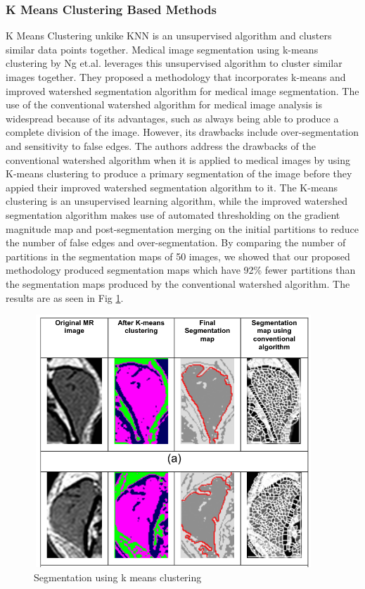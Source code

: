 \documentclass[19pt]{article}
\begin{document}
\subsubsection{K Means Clustering Based Methods}
K Means Clustering unkike KNN is an unsupervised algorithm and clusters similar data points together. Medical image segmentation using k-means clustering by Ng et.al. \cite{ng2006medical} leverages this unsupervised algorithm to cluster similar images together. They proposed a methodology that incorporates k-means and improved watershed segmentation algorithm for medical image segmentation. The use of the conventional watershed algorithm for medical image analysis is widespread because of its advantages, such as always being able to produce  a  complete    division    of    the    image.    However,    its    drawbacks  include  over-segmentation  and  sensitivity  to   false   edges.   The authors  address   the   drawbacks   of   the   conventional watershed algorithm when it is applied to medical   images   by   using   K-means   clustering   to   produce  a  primary  segmentation  of  the  image  before  they   appied their   improved   watershed   segmentation   algorithm   to   it.   The   K-means   clustering   is   an   unsupervised  learning  algorithm,  while  the  improved  watershed   segmentation   algorithm   makes   use   of automated  thresholding  on  the  gradient  magnitude  map  and  post-segmentation  merging  on  the  initial  partitions  to  reduce  the  number  of  false  edges  and  over-segmentation.   By   comparing   the   number   of   partitions  in  the  segmentation  maps  of  50  images,  we  showed   that   our   proposed   methodology   produced   segmentation  maps  which  have  92\%  fewer  partitions  than    the    segmentation    maps    produced    by the conventional watershed algorithm. The results are as seen in Fig \ref{fig:5}.

\begin{center}
    \begin{figure}[!h!t!b]
        \centerline{\includegraphics[width=105mm,height=95mm]{images/k-means.png}}
        \caption{Segmentation using k means clustering} 
        \label{fig:5}
    \end{figure}
\end{center}
\end{document}

